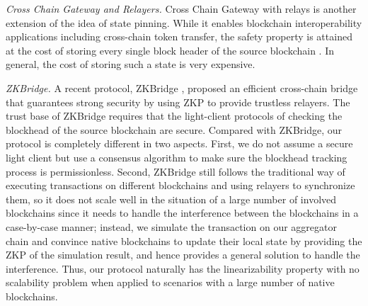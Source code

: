 \smallskip\noindent\emph{Cross Chain Gateway and Relayers.}
Cross Chain Gateway with relays is another extension of the idea of state pinning. While it enables blockchain interoperability applications including cross-chain token transfer, the safety property is attained at the cost of storing every single block header of the source blockchain \cite{belchior2021survey}. In general, the cost of storing such a state is very expensive.

\smallskip\noindent\emph{ZKBridge.}
A recent protocol, ZKBridge \cite{xie2022zkbridge-zkbridge}, proposed an efficient cross-chain bridge that guarantees strong security by using ZKP to provide trustless relayers. The trust base of ZKBridge requires that the light-client protocols of checking the blockhead of the source blockchain are secure. Compared with ZKBridge, our protocol is completely different in two aspects. First, we do not assume a secure light client but use a consensus algorithm to make sure the blockhead tracking process is permissionless. Second, ZKBridge still follows the traditional way of executing transactions on different blockchains and using relayers to synchronize them, so it does not scale well in the situation of a large number of involved blockchains since it needs to handle the interference between the blockchains in a case-by-case manner; instead, we simulate the transaction on our aggregator chain and convince native blockchains to update their local state by providing the ZKP of the simulation result, and hence provides a general solution to handle the interference. Thus, our protocol naturally has the linearizability property with no scalability problem when applied to scenarios with a large number of native blockchains.


